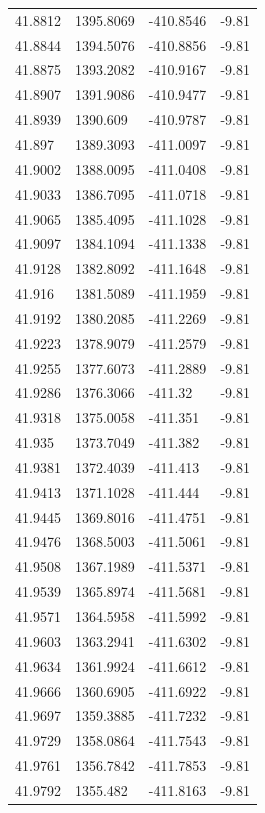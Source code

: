 \begin{table}[H]
\begin{tabular}{llll}
41.8812 & 1395.8069 & -410.8546 & -9.81 \\
41.8844 & 1394.5076 & -410.8856 & -9.81 \\
41.8875 & 1393.2082 & -410.9167 & -9.81 \\
41.8907 & 1391.9086 & -410.9477 & -9.81 \\
41.8939 & 1390.609 & -410.9787 & -9.81 \\
41.897 & 1389.3093 & -411.0097 & -9.81 \\
41.9002 & 1388.0095 & -411.0408 & -9.81 \\
41.9033 & 1386.7095 & -411.0718 & -9.81 \\
41.9065 & 1385.4095 & -411.1028 & -9.81 \\
41.9097 & 1384.1094 & -411.1338 & -9.81 \\
41.9128 & 1382.8092 & -411.1648 & -9.81 \\
41.916 & 1381.5089 & -411.1959 & -9.81 \\
41.9192 & 1380.2085 & -411.2269 & -9.81 \\
41.9223 & 1378.9079 & -411.2579 & -9.81 \\
41.9255 & 1377.6073 & -411.2889 & -9.81 \\
41.9286 & 1376.3066 & -411.32 & -9.81 \\
41.9318 & 1375.0058 & -411.351 & -9.81 \\
41.935 & 1373.7049 & -411.382 & -9.81 \\
41.9381 & 1372.4039 & -411.413 & -9.81 \\
41.9413 & 1371.1028 & -411.444 & -9.81 \\
41.9445 & 1369.8016 & -411.4751 & -9.81 \\
41.9476 & 1368.5003 & -411.5061 & -9.81 \\
41.9508 & 1367.1989 & -411.5371 & -9.81 \\
41.9539 & 1365.8974 & -411.5681 & -9.81 \\
41.9571 & 1364.5958 & -411.5992 & -9.81 \\
41.9603 & 1363.2941 & -411.6302 & -9.81 \\
41.9634 & 1361.9924 & -411.6612 & -9.81 \\
41.9666 & 1360.6905 & -411.6922 & -9.81 \\
41.9697 & 1359.3885 & -411.7232 & -9.81 \\
41.9729 & 1358.0864 & -411.7543 & -9.81 \\
41.9761 & 1356.7842 & -411.7853 & -9.81 \\
41.9792 & 1355.482 & -411.8163 & -9.81 \\

\end{tabular}
\end{table}
